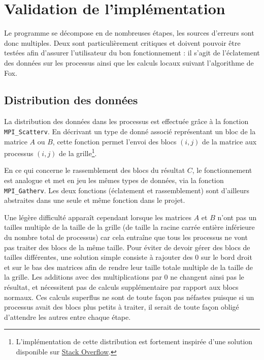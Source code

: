 \section{Validation de l'implémentation}

Le programme se décompose en de nombreuses étapes, les sources d'erreurs sont donc multiples. Deux sont particulièrement critiques et doivent pouvoir être testées afin d'assurer l'utilisateur du bon fonctionnement : il s'agit de l'éclatement des données sur les processus ainsi que les calculs locaux suivant l'algorithme de Fox.

\subsection{Distribution des données}

La distribution des données dans les processus est effectuée grâce à la fonction \texttt{MPI\_Scatterv}. En décrivant un type de donné associé représentant un bloc de la matrice $A$ ou $B$, cette fonction permet l'envoi des blocs $(i,j)$ de la matrice aux processus $(i,j)$ de la grille\footnote{L'implémentation de cette distribution est fortement inspirée d'une solution disponible sur \href{http://stackoverflow.com/questions/7549316/mpi-partition-matrix-into-blocks}{Stack Overflow}.}.

En ce qui concerne le rassemblement des blocs du résultat $C$, le fonctionnement est analogue et met en jeu les mêmes types de données, via la fonction \texttt{MPI\_Gatherv}. Les deux fonctions (éclatement et rassemblement) sont d'ailleurs abstraites dans une seule et même fonction dans le projet.

Une légère difficulté apparaît cependant lorsque les matrices $A$ et $B$ n'ont pas un tailles multiple de la taille de la grille (de taille la racine carrée entière inférieure du nombre total de processus) car cela entraîne que tous les processus ne vont pas traiter des blocs de la même taille. Pour éviter de devoir gérer des blocs de tailles différentes, une solution simple consiste à rajouter des $0$ sur le bord droit et sur le bas des matrices afin de rendre leur taille totale multiple de la taille de la grille. Les additions avec des multiplications par $0$ ne changent ainsi pas le résultat, et nécessitent pas de calculs supplémentaire par rapport aux blocs normaux. Ces calculs superflus ne sont de toute façon pas néfastes puisque si un processus avait des blocs plus petits à traiter, il serait de toute façon obligé d'attendre les autres entre chaque étape.

